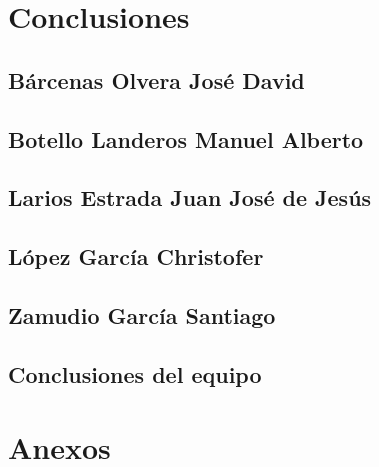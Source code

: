 \documentclass{article}
\begin{document}
\section{Conclusiones}
    \subsection{Bárcenas Olvera José David}
        
    \subsection{Botello Landeros Manuel Alberto}
       
    \subsection{Larios Estrada Juan José de Jesús}

    \subsection{López García Christofer}
        
    \subsection{Zamudio García Santiago}
        
    \subsection{Conclusiones del equipo}
        
\vspace{10 mm}

\newpage

\section{Anexos}
\end{document}
